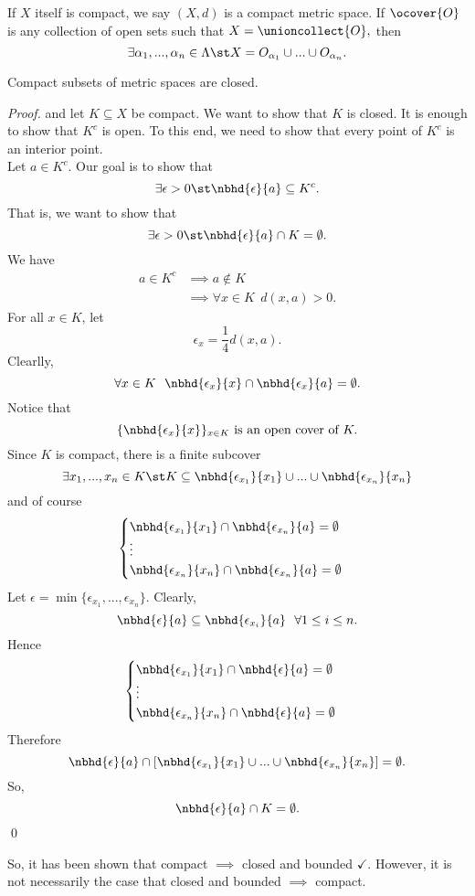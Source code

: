 \documentclass[a4paper]{article}
\begin{document}
	\begin{remark}
		If $X$ itself is compact, we say $(X,d)$ is a compact metric space.
		If $\ocover{O}$ is any collection of open sets such that $X= \unioncollect{O},$ then
		$$\exists \alpha_{1}, ..., \alpha_n \in \Lambda \st X = O_{\alpha_1} \cup ... \cup O_{\alpha_n}.$$
	\end{remark}
	
	\begin{theorem}
		Compact subsets of metric spaces are closed.
	\end{theorem}
	\begin{proof}
		\routineMS and let $K\subseteq X$ be compact. We want to show that $K$ is closed. It is enough to show that $K^c$ is open. To this end, we need to show that every point of $K^c$ is an interior point. \\
		Let $a\in K^c$. Our goal is to show that $$\exists \epsilon > 0 \st \nbhd{\epsilon}{a} \subseteq K^c.$$
		That is, we want to show that $$\exists \epsilon > 0 \st \nbhd{\epsilon}{a} \cap K = \emptyset.$$
		We have
		\begin{align*}
			a \in K^c &\implies a \not \in K \\
			&\implies \forall x \in K ~~ d(x,a) > 0.
		\end{align*}
		For all $x\in K$, let $$\epsilon_x = \frac{1}{4}d(x,a).$$
		Clearlly, $$\forall x \in K ~~ \nbhd{\epsilon_x}{x} \cap \nbhd{\epsilon_x}{a} = \emptyset.$$
		Notice that $$\{\nbhd{\epsilon_x}{x}\}_{x\in K} \text { is an open cover of } K.$$
		Since $K$ is compact, there is a finite subcover $$\exists x_1,..., x_n \in K \st K \subseteq \nbhd{\epsilon_{x_1}}{x_1} \cup ... \cup \nbhd{\epsilon_{x_n}}{x_n}$$
		and of course
		$$\begin{cases}
			\nbhd{\epsilon_{x_1}}{x_1}\cap \nbhd{\epsilon_{x_n}}{a} = \emptyset \\
			\vdots \\
			\nbhd{\epsilon_{x_n}}{x_n}\cap \nbhd{\epsilon_{x_n}}{a} = \emptyset
		\end{cases}$$
		Let $\epsilon=\min\{\epsilon_{x_1}, ..., \epsilon_{x_n}\}$. Clearly,
		$$\nbhd{\epsilon}{a} \subseteq \nbhd{\epsilon_{x_i}}{a} ~~ \forall 1 \leq i \leq n.$$
		Hence
		$$\begin{cases}
			\nbhd{\epsilon_{x_1}}{x_1} \cap \nbhd{\epsilon}{a} = \emptyset \\
			\vdots \\
			\nbhd{\epsilon_{x_n}}{x_n} \cap \nbhd{\epsilon}{a} = \emptyset
		\end{cases}$$
		Therefore
		$$
		\nbhd{\epsilon}{a} \cap [ \nbhd{\epsilon_{x_1}}{x_1}\cup ... \cup \nbhd{\epsilon_{x_n}}{x_n}] =\emptyset.
		$$
		So,
		$$
			\nbhd{\epsilon}{a} \cap K = \emptyset.
		$$
		\qed
	\end{proof}
	
	\begin{note}
			So, it has been shown that compact $\implies$ closed and bounded $\checkmark$. However, it is not necessarily the case that closed and bounded $\implies$ compact.
	\end{note}
\end{document}
